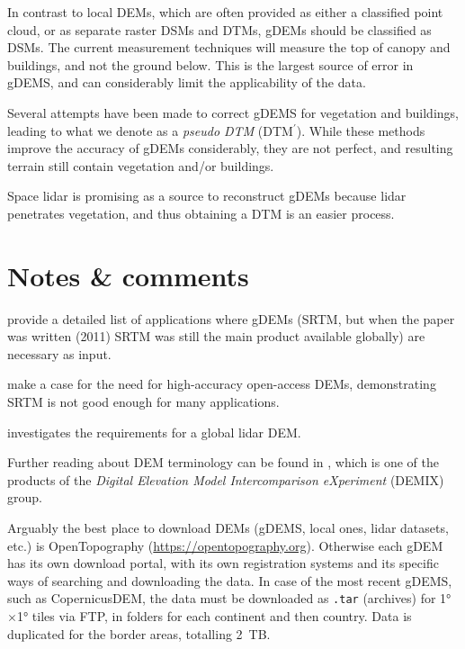 In contrast to local DEMs, which are often provided as either a classified point cloud, or as separate raster DSMs and DTMs, gDEMs should be classified as DSMs.
The current measurement techniques will measure the top of canopy and buildings, and not the ground below.
This is the largest source of error in gDEMS, and can considerably limit the applicability of the data.

%

Several attempts have been made to correct gDEMS for vegetation and buildings, leading to what we denote as a \emph{pseudo DTM} (DTM$^{\prime}$).
While these methods improve the accuracy of gDEMs considerably, they are not perfect, and resulting terrain still contain vegetation and/or buildings.

%

Space lidar is promising as a source to reconstruct gDEMs because lidar penetrates vegetation, and thus obtaining a DTM is an easier process.


%
\section{Notes \& comments}


\citet{Yang11} provide a detailed list of applications where gDEMs (SRTM, but when the paper was written (2011) SRTM was still the main product available globally) are necessary as input.

\citet{Schumann2018} make a case for the need for high-accuracy open-access DEMs, demonstrating SRTM is not good enough for many applications.

\citet{Hancock2021} investigates the requirements for a global lidar DEM\@.

Further reading about DEM terminology can be found in \citet{Guth2021}, which is one of the products of the \emph{Digital Elevation Model Intercomparison eXperiment} (DEMIX) group.

Arguably the best place to download DEMs (gDEMS, local ones, lidar datasets, etc.) is OpenTopography (\url{https://opentopography.org}).
Otherwise each gDEM has its own download portal, with its own registration systems and its specific ways of searching and downloading the data.
In case of the most recent gDEMS, such as CopernicusDEM, the data must be downloaded as \texttt{.tar} (archives) for \ang{1}$\times$\ang{1} tiles via FTP, in folders for each continent and then country.
Data is duplicated for the border areas, totalling \qty{2}{TB}.

